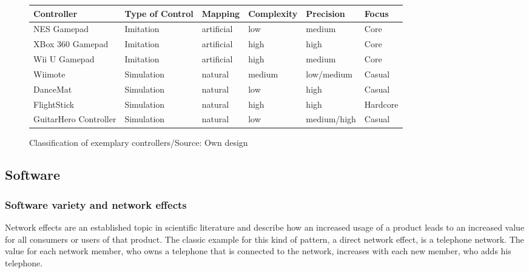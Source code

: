\documentclass
[
    a4paper,
    11pt
]
{article}
\begin{document}
\begin{figure}[ht!]
    \centering
    \small
    \begin{tabular}{  l  l  l l  l l }\hline
        Controller      &   Type of Control &   Mapping         &   Complexity  &   Precision   & Focus\\ \hline \hline
        NES Gamepad     &   Imitation       &   artificial       &   low         &   medium      & Core\\
        XBox 360 Gamepad&   Imitation       &   artificial      &   high        &   high        & Core\\
        Wii U Gamepad   &   Imitation       &   artificial      &   high        &   medium      & Core\\
        Wiimote         &   Simulation      &   natural\footnotemark			&  medium      &   low/medium  & Casual\\
        DanceMat        &   Simulation      &   natural         &   low         &   high        & Casual\\
        FlightStick     &   Simulation      &   natural         &   high        &   high        & Hardcore\\
        GuitarHero Controller&  Simulation  &   natural         &   low         &   medium/high & Casual\\ \hline
    \end{tabular}
    \caption{Classification of exemplary controllers/Source: Own design}
    \label{tab:controllerclassification}
\end{figure}


\subsection{Software}
\label{software}
%
\subsubsection{Software variety and network effects}
\label{network-effects}
%
Network effects are an established topic in scientific literature and describe
how an increased usage of a product leads to an increased value for all consumers
or users of that product. \cite{Katz1985} The classic example for this kind of
pattern, a direct network effect, is a telephone network. The value for each
network member, who owns a telephone that is connected to the network, increases
with each new member, who adds his telephone. \cite{Rohlfs1974}
\end{document}
